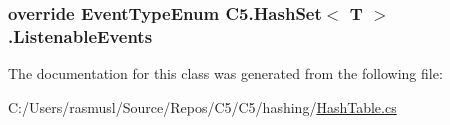 \hypertarget{class_c5_1_1_hash_set_a55a5a5a8a33bd7058881493bc3d3ae6a}{}
\subsubsection[{Listenable\+Events}]{\setlength{\rightskip}{0pt plus 5cm}override {\bf Event\+Type\+Enum} {\bf C5.\+Hash\+Set}$<$ T $>$.Listenable\+Events\hspace{0.3cm}{\ttfamily [get]}}\label{class_c5_1_1_hash_set_a55a5a5a8a33bd7058881493bc3d3ae6a}






The documentation for this class was generated from the following file\+:\begin{DoxyCompactItemize}
\item 
C\+:/\+Users/rasmusl/\+Source/\+Repos/\+C5/\+C5/hashing/\hyperlink{_hash_table_8cs}{Hash\+Table.\+cs}\end{DoxyCompactItemize}
